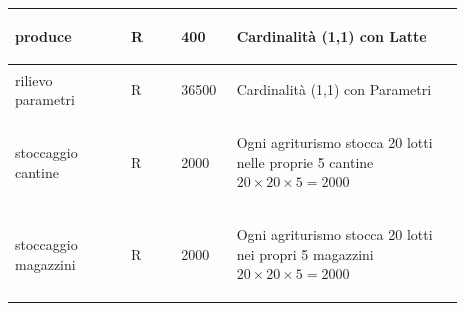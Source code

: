 \documentclass[12pt,a4paper]{article}
\begin{document}
\begin{center}
\begin{longtable}{|p{0.23\linewidth}|p{0.1\linewidth}|p{0.11\linewidth}|p{0.45\linewidth}|}
\hline
produce 				& \begin{center}
\vspace{-25pt}R
\end{center}
					& \begin{center}
					\vspace{-25pt}400\end{center}
					& \begin{flushleft}\vspace{-25pt} Cardinalità (1,1) con Latte \end{flushleft}\\ 

\hline
rilievo parametri 				& \begin{center}
\vspace{-25pt}R
\end{center}
					& \begin{center}
					\vspace{-25pt}36500\end{center}
					& \begin{flushleft}\vspace{-25pt} Cardinalità (1,1) con Parametri \end{flushleft}\\ 

\hline
stoccaggio cantine 				& \begin{center}
\vspace{-25pt}R
\end{center}
					& \begin{center}
					\vspace{-25pt}2000\end{center}
					& \begin{flushleft}\vspace{-25pt} Ogni agriturismo stocca 20 lotti nelle proprie 5 cantine $20\times 20 \times 5 = 2000$ \end{flushleft}\\ 

\hline
stoccaggio magazzini 				& \begin{center}
\vspace{-25pt}R
\end{center}
					& \begin{center}
					\vspace{-25pt}2000\end{center}
					& \begin{flushleft}\vspace{-25pt} Ogni agriturismo stocca 20 lotti nei propri 5 magazzini $20\times 20 \times 5 = 2000$ \end{flushleft}\\ 


\end{longtable}
\end{center}
\end{document}
